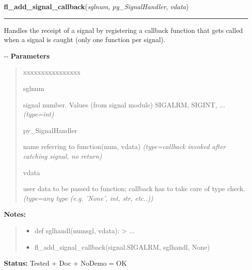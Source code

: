     \label{xformslib:flbasic:fl_add_signal_callback}

    \vspace{0.5ex}

\hspace{.8\funcindent}\begin{boxedminipage}{\funcwidth}

    \raggedright \textbf{fl\_add\_signal\_callback}(\textit{sglnum}, \textit{py\_SignalHandler}, \textit{vdata})

    \vspace{-1.5ex}

    \rule{\textwidth}{0.5\fboxrule}
\setlength{\parskip}{2ex}

Handles the receipt of a signal by registering a callback function that
gets called when a signal is caught (only one function per signal).

-{}-
\setlength{\parskip}{1ex}
      \textbf{Parameters}
      \vspace{-1ex}

      \begin{quote}
        \begin{Ventry}{xxxxxxxxxxxxxxxx}

          \item[sglnum]


signal number. Values (from signal module) SIGALRM, SIGINT, ...
            {\it (type=int)}

          \item[py\_SignalHandler]


name referring to function(num, vdata)
            {\it (type=callback invoked after catching signal, no return)}

          \item[vdata]


user data to be passed to function; callback has to take care of
type check.
            {\it (type=any type (e.g. 'None', int, str, etc..))}

        \end{Ventry}

      \end{quote}

\textbf{Notes:}
\begin{quote}
  \begin{itemize}

  \item
    \setlength{\parskip}{0.6ex}

def sglhandl(numsgl, vdata): > ...


  \item 
fl\_add\_signal\_callback(signal.SIGALRM, sglhandl, None)


\end{itemize}

\end{quote}

\textbf{Status:} 
Tested + Doc + NoDemo = OK


    \end{boxedminipage}

